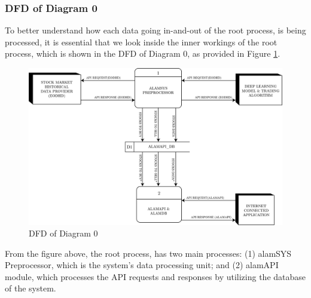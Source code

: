 \subsubsection{DFD of Diagram 0}
\label{subsubsec:dfd0}
To better understand how each data going in-and-out 
of the root process, is being processed, it is essential that we look inside 
the inner workings of the root process, which is shown in the DFD of Diagram 0, 
as provided in Figure \ref{fig:dfd0}.
\begin{figure}[ht]
    \centering
    \includegraphics[width=1\textwidth]{./assets/Chapter_3/DFD/DFD_0.png}
    \caption{DFD of Diagram 0}
    \label{fig:dfd0}
\end{figure}
\FloatBarrier

From the figure above, the root process, has two main processes: 
(1) alamSYS Preprocessor, which is the system’s data processing unit; and 
(2) alamAPI module, which processes the API 
requests and responses by utilizing the database of the system.

